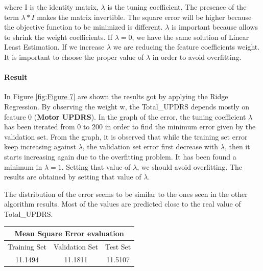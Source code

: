 \documentclass[12pt,a4paper,oneside]{article}
\begin{document}
	where I is the identity matrix, $\lambda$ is the tuning coefficient. The presence of the term $\lambda*I$ makes the matrix invertible. The square error will be higher because the objective function to be minimized is different. $\lambda$ is important because allows to shrink the weight coefficients. If $\lambda=0$, we have the same solution of Linear Least Estimation. If we increase $\lambda$ we are reducing the feature coefficients weight. It is important to choose the proper value of $\lambda$ in order to avoid overfitting.
	\paragraph{Result}
	In Figure \ref{fig:Figure 7} are shown the results got by applying the Ridge Regression. By observing the weight w, the Total\_UPDRS depends mostly on feature 0 (\textbf{Motor UPDRS}). In the graph of the error, the tuning coefficient $\lambda$ has been iterated from 0 to 200 in order to find the minimum error given by the validation set. From the graph, it is observed that while the training set error keep increasing against $\lambda$, the validation set error first decrease with $\lambda$, then it starts increasing again due to the overfitting problem. It has been found a minimum in $\lambda=1$. Setting that value of $\lambda$, we should avoid overfitting. The results are obtained by setting that value of $\lambda$.
	
	The distribution of the error seems to be similar to the ones seen in the other algorithm results. Most of the values are predicted close to the real value of Total\_UPDRS. 
	
	\begin{center}
		\begin{tabular}{ccc}	
			\toprule
			\multicolumn{3}{c}{\textbf{Mean Square Error evaluation}} \\ 
			\midrule 
			Training Set & Validation Set & Test Set \\ 
			\midrule 
			11.1494 & 11.1811 & 11.5107 \\ 
			\bottomrule 
		\end{tabular} 
	\end{center}
	
\end{document}
